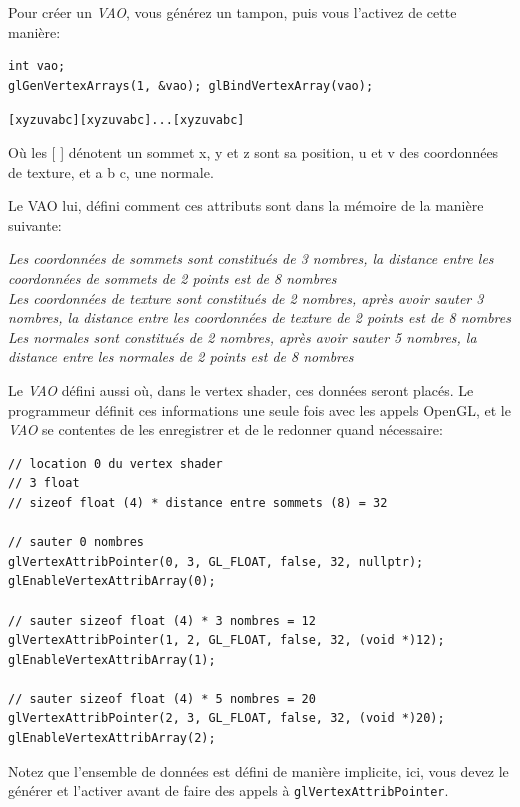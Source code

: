 \documentclass[pdftex, 11pt, a4paper, titlepage]{article}
\begin{document}
Pour créer un \emph{VAO}, vous générez un tampon, puis vous l'activez de
cette manière:

\begin{lstlisting}
int vao;
glGenVertexArrays(1, &vao); glBindVertexArray(vao);
\end{lstlisting}


\begin{alltt}
[x y z u v a b c][x y z u v a b c]...[x y z u v a b c]
\end{alltt}
Où les [ ] dénotent un sommet x, y et z sont sa position, u et v des
coordonnées de texture, et a b c, une normale.

Le VAO lui, défini comment ces attributs sont dans la mémoire de la
manière suivante:

\emph{Les coordonnées de sommets sont constitués de 3 nombres, la
  distance entre les coordonnées de sommets de 2 points est de 8
  nombres\\}
\emph{Les coordonnées de texture sont constitués de 2
  nombres, après avoir sauter 3 nombres, la distance entre les
  coordonnées de texture de 2 points est de 8 nombres\\}
\emph{Les normales sont constitués de 2 nombres, après avoir sauter
 5 nombres, la distance entre les normales de 2 points est de 8
 nombres\\}

Le \emph{VAO} défini aussi où, dans le vertex shader, ces données seront
placés.  Le programmeur définit ces informations une seule fois avec
les appels OpenGL, et le \emph{VAO} se contentes de les enregistrer et de le
redonner quand nécessaire:

\begin{lstlisting}
// location 0 du vertex shader
// 3 float
// sizeof float (4) * distance entre sommets (8) = 32

// sauter 0 nombres
glVertexAttribPointer(0, 3, GL_FLOAT, false, 32, nullptr);
glEnableVertexAttribArray(0);

// sauter sizeof float (4) * 3 nombres = 12
glVertexAttribPointer(1, 2, GL_FLOAT, false, 32, (void *)12);
glEnableVertexAttribArray(1);

// sauter sizeof float (4) * 5 nombres = 20 
glVertexAttribPointer(2, 3, GL_FLOAT, false, 32, (void *)20);
glEnableVertexAttribArray(2);
\end{lstlisting}

Notez que l'ensemble de données est défini de manière implicite, ici,
vous devez le générer et l'activer avant de faire des appels à
\texttt{glVertexAttribPointer}.
\end{document}
